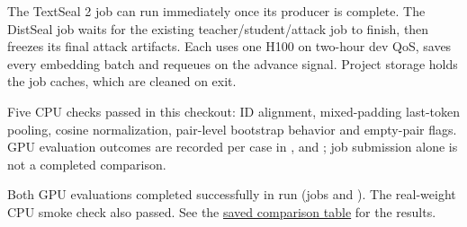 The TextSeal 2 job can run immediately once its producer is complete.
The DistSeal job waits for the existing teacher/student/attack job to
finish, then freezes its final attack artifacts. Each uses one H100 on
two-hour dev QoS, saves every embedding batch and requeues on the
advance signal. Project storage holds the job caches, which are cleaned
on exit.

Five CPU checks passed in this checkout: ID alignment, mixed-padding
last-token pooling, cosine normalization, pair-level bootstrap behavior
and empty-pair flags. GPU evaluation outcomes are recorded per case in
\texttt{}, \texttt{} and
\texttt{}; job submission alone is not a completed
comparison.

Both GPU evaluations completed successfully in run
\texttt{} (jobs
\texttt{} and \texttt{}). The
real-weight CPU smoke check also passed. See the
\href{records/docs/jina_similarity_results.tex}{saved comparison table}
for the results.
